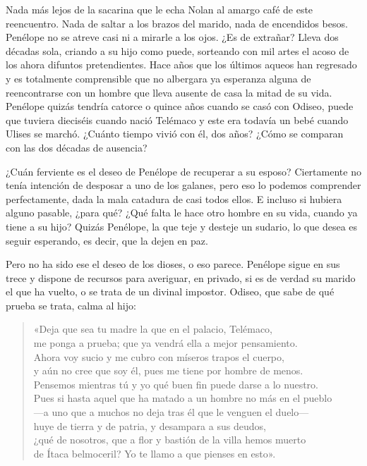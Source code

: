 Nada más lejos de la sacarina que le echa Nolan al amargo café de este reencuentro. Nada de saltar a los brazos del marido, nada de encendidos besos. Penélope no se atreve casi ni a mirarle a los ojos. ¿Es de extrañar? Lleva dos décadas sola, criando a su hijo como puede, sorteando con mil artes el acoso de los ahora difuntos pretendientes. Hace años que los últimos aqueos han regresado y es totalmente comprensible que no albergara ya esperanza alguna de reencontrarse con un hombre que lleva ausente de casa la mitad de su vida. Penélope quizás tendría catorce o quince años cuando se casó con Odiseo, puede que tuviera dieciséis cuando nació Telémaco y este era todavía un bebé cuando Ulises se marchó. ¿Cuánto tiempo vivió con él, dos años? ¿Cómo se comparan con las dos décadas de ausencia?

¿Cuán ferviente es el deseo de Penélope de recuperar a su esposo? Ciertamente no tenía intención de desposar a uno de los galanes, pero eso lo podemos comprender perfectamente, dada la mala catadura de casi todos ellos. E incluso si hubiera alguno pasable, ¿para qué? ¿Qué falta le hace otro hombre en su vida, cuando ya tiene a su hijo? Quizás Penélope, la que teje y desteje un sudario, lo que desea es seguir esperando, es decir, que la dejen en paz.

Pero no ha sido ese el deseo de los dioses, o eso parece. Penélope sigue en sus trece y dispone de recursos para averiguar, en privado, si es de verdad su marido el que ha vuelto, o se trata de un divinal impostor. Odiseo, que sabe de qué prueba se trata, calma al hijo:

\begin{verse}
«Deja que sea tu madre la que en el palacio, Telémaco,\\
me ponga a prueba; que ya vendrá ella a mejor pensamiento.\\
Ahora voy sucio y me cubro con míseros trapos el cuerpo,\\
y aún no cree que soy él, pues me tiene por hombre de menos.\\
Pensemos mientras tú y yo qué buen fin puede darse a lo nuestro.\\
Pues si hasta aquel que ha matado a un hombre no más en el pueblo\\
---a uno que a muchos no deja tras él que le venguen el duelo---\\
huye de tierra y de patria, y desampara a sus deudos,\\
¿qué de nosotros, que a flor y bastión de la villa hemos muerto\\
de Ítaca belmoceril? Yo te llamo a que pienses en esto».
\end{verse}

